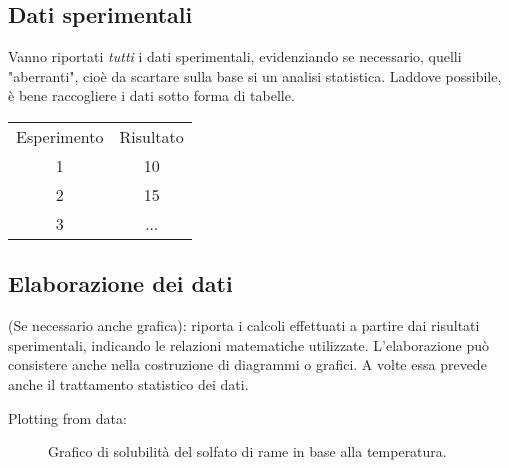 \subsection{Dati sperimentali}
Vanno riportati \textit{tutti} i dati sperimentali, evidenziando se necessario, quelli "aberranti", cioè da scartare sulla base si un analisi statistica.
Laddove possibile, è bene raccogliere i dati sotto forma di tabelle.
\vspace{1ex}
\begin {center}
\begin{tabular}{c|c}
     Esperimento &  Risultato\\
     1 & 10\\
     2 & 15\\
     3 & ...
\end{tabular}
\end {center}

\subsection{Elaborazione dei dati}
(Se necessario anche grafica): riporta i calcoli effettuati a partire dai risultati sperimentali, indicando le relazioni matematiche utilizzate. L'elaborazione può consistere anche nella costruzione di diagrammi o grafici.
A volte essa prevede anche il trattamento statistico dei dati.

Plotting from data:
\begin{center}
\vspace{2ex}
\begin{figure}[!ht]
    \centering
    \caption{Grafico di solubilità del solfato di rame in base alla temperatura.}
    \label{plt:1}
\end{figure}

\end{center}
\newpage

